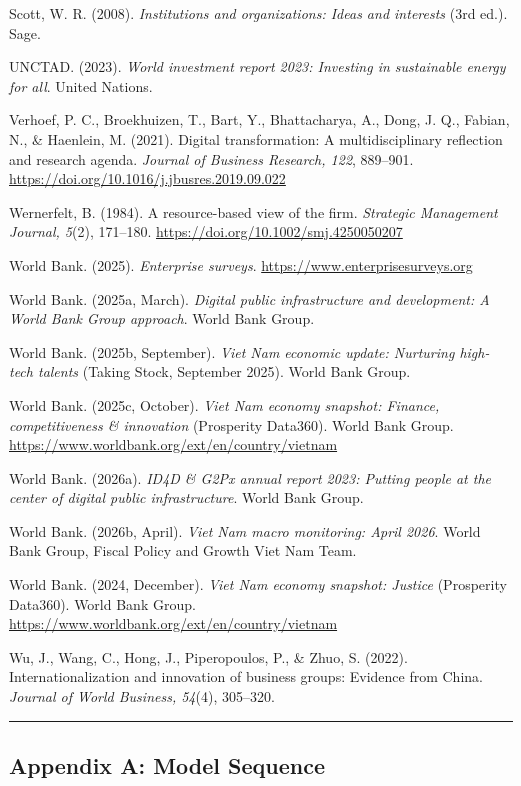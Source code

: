 \documentclass[12pt,a4paper]{article}
\begin{document}
Scott, W. R. (2008). \emph{Institutions and organizations: Ideas and
interests} (3rd ed.). Sage.

UNCTAD. (2023). \emph{World investment report 2023: Investing in
sustainable energy for all}. United Nations.

Verhoef, P. C., Broekhuizen, T., Bart, Y., Bhattacharya, A., Dong, J.
Q., Fabian, N., \& Haenlein, M. (2021). Digital transformation: A
multidisciplinary reflection and research agenda. \emph{Journal of
Business Research, 122}, 889--901.
\url{https://doi.org/10.1016/j.jbusres.2019.09.022}

Wernerfelt, B. (1984). A resource-based view of the firm.
\emph{Strategic Management Journal, 5}(2), 171--180.
\url{https://doi.org/10.1002/smj.4250050207}

World Bank. (2025). \emph{Enterprise surveys}.
\url{https://www.enterprisesurveys.org}

World Bank. (2025a, March). \emph{Digital public infrastructure and
development: A World Bank Group approach}. World Bank Group.

World Bank. (2025b, September). \emph{Viet Nam economic update:
Nurturing high-tech talents} (Taking Stock, September 2025). World Bank
Group.

World Bank. (2025c, October). \emph{Viet Nam economy snapshot: Finance,
competitiveness \& innovation} (Prosperity Data360). World Bank Group.
\url{https://www.worldbank.org/ext/en/country/vietnam}

World Bank. (2026a). \emph{ID4D \& G2Px annual report 2023: Putting
people at the center of digital public infrastructure}. World Bank
Group.

World Bank. (2026b, April). \emph{Viet Nam macro monitoring: April
2026}. World Bank Group, Fiscal Policy and Growth Viet Nam Team.

World Bank. (2024, December). \emph{Viet Nam economy snapshot: Justice}
(Prosperity Data360). World Bank Group.
\url{https://www.worldbank.org/ext/en/country/vietnam}

Wu, J., Wang, C., Hong, J., Piperopoulos, P., \& Zhuo, S. (2022).
Internationalization and innovation of business groups: Evidence from
China. \emph{Journal of World Business, 54}(4), 305--320.

\begin{center}\rule{0.5\linewidth}{0.5pt}\end{center}

\hypertarget{appendix-a-model-sequence}{%
\subsection{Appendix A: Model
Sequence}\label{appendix-a-model-sequence}}
\end{document}
